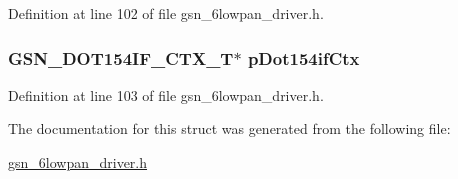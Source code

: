 Definition at line 102 of file gsn\_\-6lowpan\_\-driver.h.

\hypertarget{a00019_a91d8d05dbfee6a1576323053fad49148}{
\subsubsection[{pDot154ifCtx}]{\setlength{\rightskip}{0pt plus 5cm}GSN\_\-DOT154IF\_\-CTX\_\-T$\ast$ {\bf pDot154ifCtx}}}
\label{a00019_a91d8d05dbfee6a1576323053fad49148}


Definition at line 103 of file gsn\_\-6lowpan\_\-driver.h.



The documentation for this struct was generated from the following file:\begin{DoxyCompactItemize}
\item 
\hyperlink{a00472}{gsn\_\-6lowpan\_\-driver.h}\end{DoxyCompactItemize}
